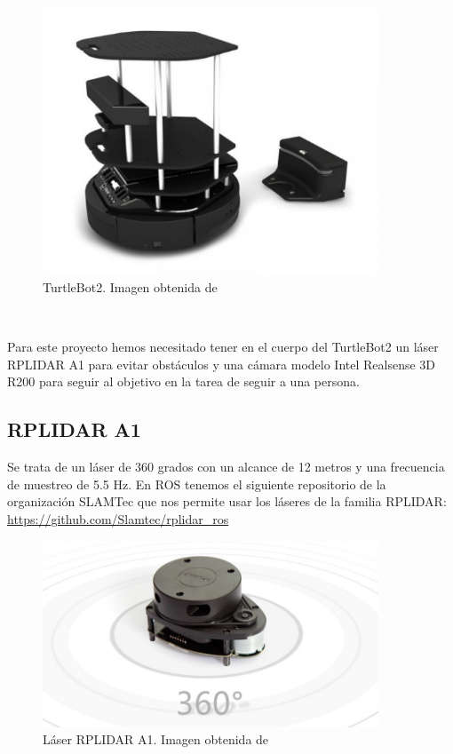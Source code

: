 \begin{figure} [H]
  \begin{center}
    \includegraphics[width=10cm]{imagenes/cap3/turtlebot2-real.png}
  \end{center}
  \caption[TurtleBot2]{TurtleBot2. Imagen obtenida de \cite{turtlebot2}}
  \label{fig:turtlebot2_real}
\end{figure}\

Para este proyecto hemos necesitado tener en el cuerpo del TurtleBot2 un láser RPLIDAR A1 para evitar obstáculos y una cámara modelo Intel Realsense 3D R200 para seguir al objetivo en la tarea de seguir a una persona.

\subsection{RPLIDAR A1}
\label{subsec:turtlebot2_rplidar_a1}

Se trata de un láser de 360 grados con un alcance de 12 metros y una frecuencia de muestreo de 5.5 Hz. En ROS tenemos el siguiente repositorio de la organización SLAMTec que nos permite usar los láseres de la familia RPLIDAR: \url{https://github.com/Slamtec/rplidar_ros}\\

\begin{figure} [H]
  \begin{center}
    \includegraphics[width=10cm]{imagenes/cap3/rplidar-a1.png}
  \end{center}
  \caption[Láser RPLIDAR A1]{Láser RPLIDAR A1. Imagen obtenida de \cite{rplidar_a1}}
  \label{fig:rplidar_a1}
\end{figure}\

